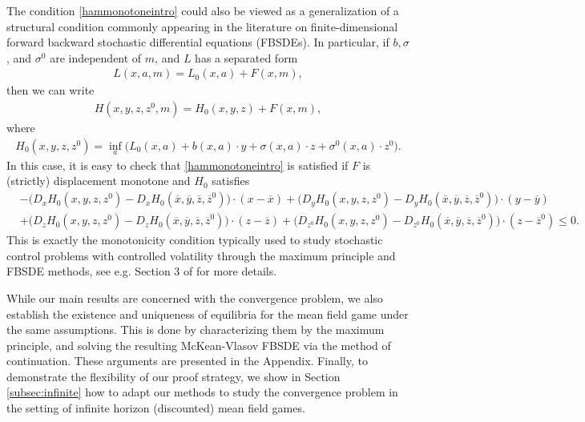 \documentclass[11pt,reqno]{amsart}
\numberwithin{equation}{section}
\theoremstyle{definition}
\newcommand{\ov}{\overline}
\begin{document}
The condition \eqref{hammonotoneintro} could also be viewed as a generalization of a structural condition  commonly appearing in the literature on finite-dimensional forward backward stochastic differential equations (FBSDEs). In particular, if $b, \sigma$, and $\sigma^0$ are independent of $m$, and $L$ has a separated form 
\begin{align*}
    L(x,a,m) = L_0(x,a) + F(x,m), 
\end{align*}
then we can write 
\begin{align*}
    H(x,y,z,z^0,m) = H_0(x,y,z) + F(x,m), 
\end{align*}
where 
\begin{align*}
    H_0(x,y,z,z^0) = \inf_{a} \Big(L_0(x,a) + b(x,a) \cdot y + \sigma(x,a) \cdot z + \sigma^0(x,a) \cdot z^0 \Big).
\end{align*}
In this case, it is easy to check that \eqref{hammonotoneintro} is satisfied if $F$ is (strictly) displacement monotone and $H_0$ satisfies 
\begin{align*}
    &-\Big(D_xH_0(x,y,z,z^0) - D_xH_0(\ov{x},\ov{y},\ov{z},\ov{z}^0) \Big) \cdot (x - \ov{x}) 
    + \Big(D_yH_0(x,y,z,z^0) - D_yH_0(\ov{x},\ov{y},\ov{z},\ov{z}^0) \Big) \cdot (y - \ov{y}) \\
    &+ 
    \Big(D_zH_0(x,y,z,z^0) - D_zH_0(\ov{x},\ov{y},\ov{z},\ov{z}^0) \Big) \cdot (z - \ov{z})
    + 
    \Big(D_{z^0}H_0(x,y,z,z^0) - D_{z^0}H_0(\ov{x},\ov{y},\ov{z},\ov{z}^0) \Big) \cdot (z - \ov{z}^0) \leq 0.
\end{align*}
This is exactly the monotonicity condition typically used to study stochastic control problems with controlled volatility through the maximum principle and FBSDE methods, see e.g. Section 3 of \cite{pengwumonotone} for more details.


While our main results are concerned with the convergence problem, we also establish the existence and uniqueness of equilibria for the mean field game under the same assumptions. This is done by characterizing them by the maximum principle, and solving the resulting McKean-Vlasov FBSDE via the method of continuation. These arguments are presented in the Appendix. Finally, to demonstrate the flexibility of our proof strategy, we show in Section \ref{subsec:infinite} how to adapt our methods to study the convergence problem in the setting of infinite horizon (discounted) mean field games.
\end{document}
